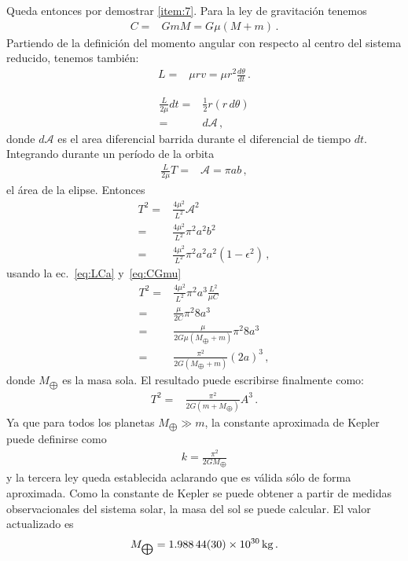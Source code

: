 Queda entonces por demostrar \ref{item:7}. Para la ley de gravitación tenemos
\begin{align}
\label{eq:CGmu}
    C=&GmM=G\mu(M+m)\,.
\end{align}
Partiendo de la definición del momento angular con respecto al centro del sistema reducido, tenemos también:
\begin{align}
  L=&\mu r v=\mu r^2 \frac{d\theta}{dt}\,.
\end{align}

\begin{align}
  \frac{L}{2\mu}dt =&\frac{1}{2}r (r\,d\theta)\nonumber\\
=&d\mathcal{A}\,,
\end{align}
donde $d\mathcal{A}$ es el area diferencial barrida durante el diferencial de tiempo $dt$. Integrando durante un período de la orbita
\begin{align}
  \frac{L}{2\mu} T=&\mathcal{A}=\pi a b\,,
\end{align}
el área de la elipse. Entonces
\begin{align*}
  T^2=&\frac{4\mu^2}{L^2}\mathcal{A}^2\nonumber\\
  =&\frac{4\mu^2}{L^2}\pi^2 a^2 b^2 \nonumber\\
   =&\frac{4\mu^2}{L^2}\pi^2 a^2 a^2(1-\epsilon^2)\,,
\end{align*}
usando la ec.~\eqref{eq:LCa} y~\eqref{eq:CGmu}
\begin{align}
   T^2=&\frac{4\mu^2}{L^2}\pi^2 a^3 \frac{L^2}{\mu C}\nonumber\\
   =&\frac{\mu}{2C}\pi^2 8a^3 \nonumber\\
   =&\frac{\mu}{2G\mu(M_{\bigoplus}+m)}\pi^2 8a^3 \nonumber\\
   =&\frac{\pi^2}{2G(M_{\bigoplus}+m)} (2a)^3 \,,
\end{align}
donde $M_{\bigoplus}$ es la masa sola. El resultado puede escribirse finalmente como:
\begin{align}
  T^2=&\frac{\pi^2}{2G(m+M_{\bigoplus})}A^3 \,.
\end{align}
Ya que para todos los planetas $M_{\bigoplus}\gg m$, la constante aproximada de Kepler puede definirse como
\begin{align}
  k=\frac{\pi^2}{2GM_{\bigoplus}}
\end{align}
y la tercera ley queda establecida aclarando que es válida sólo de
forma aproximada. Como la constante de Kepler se puede obtener a
partir de medidas observacionales del sistema solar, la masa del sol
se puede calcular. El valor actualizado es
\begin{align}
  M_{\bigoplus}=\SI{1.98844(30)E30}{kg}\,.
\end{align}




